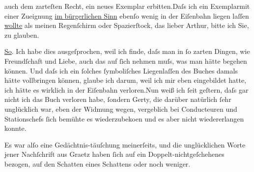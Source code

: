                auch dem zarteſten Recht, ein neues Exemplar erbitten.\hspace*{1.5em}Daſs ich ein Exemplarmit einer Zueignung \uline{im bürgerlichen Sinn} ebenſo wenig in der Eiſenbahn liegen
               laſſen \uline{wollte} als meinen Regenſchirm oder
               Spazierſtock, das lieber Arthur, bitte ich Sie, zu glauben.\pend
           
\pstart
           \uline{So}. Ich habe dies ausgeſprochen, weil ich finde, daſs
               man in{ }ſo zarten Dingen, wie Freundſchaft und Liebe, auch das auf{ }ſich nehmen muſs,
               was man hätte begehen können. Und {\pb}daſs ich ein{ }ſolches{ }ſymboliſches Liegenlaſſen des Buches damals hätte vollbringen können,
               glaube ich darum, weil ich mir eben eingebildet hatte, ich hätte es wirklich in der
               Eiſenbahn verloren.\hspace*{1.5em}Nun weiß ich{ }ſeit geſtern, daſs
               gar nicht ich das Buch
               verloren habe,{ }{\pb}ſondern Gerty, die darüber natürlich{ }ſehr unglücklich war, eben der
               Widmung wegen, vergeblich bei Conducteuren und Stationschefs{ }ſich bemühte es
                  wiederzubeko{\geminationm}en und es aber nicht wiedererlangen
               konnte.\pend
           
\pstart
           Es war alſo eine Gedächtnis-täuſchung {\pb}meinerſeits, und die unglücklichen
               Worte jener Nachſchrift aus Graetz haben{ }ſich auf
               ein Doppelt-nichtgeſchehenes bezogen, auf den Schatten eines Schattens oder noch
               weniger.\pend
           
